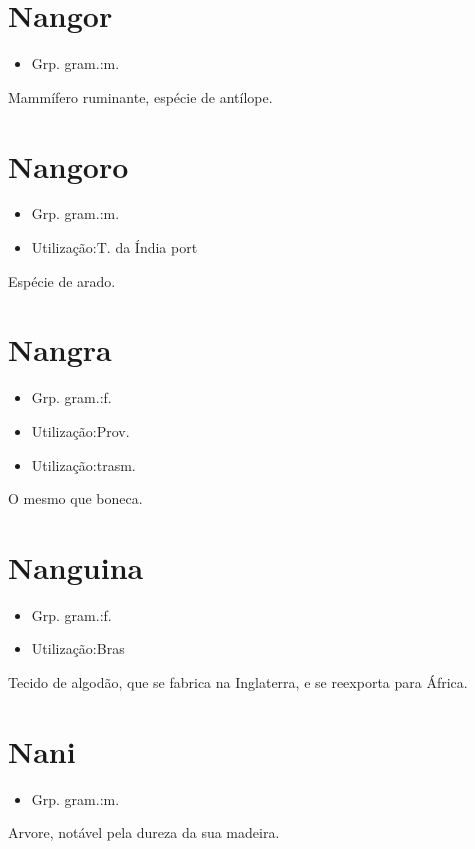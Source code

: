 \section{Nangor}
\begin{itemize}
\item {Grp. gram.:m.}
\end{itemize}
Mammífero ruminante, espécie de antílope.
\section{Nangoro}
\begin{itemize}
\item {Grp. gram.:m.}
\end{itemize}
\begin{itemize}
\item {Utilização:T. da Índia port}
\end{itemize}
Espécie de arado.
\section{Nangra}
\begin{itemize}
\item {Grp. gram.:f.}
\end{itemize}
\begin{itemize}
\item {Utilização:Prov.}
\end{itemize}
\begin{itemize}
\item {Utilização:trasm.}
\end{itemize}
O mesmo que \textunderscore boneca\textunderscore .
\section{Nanguina}
\begin{itemize}
\item {Grp. gram.:f.}
\end{itemize}
\begin{itemize}
\item {Utilização:Bras}
\end{itemize}
Tecido de algodão, que se fabrica na Inglaterra, e se reexporta para África.
\section{Nani}
\begin{itemize}
\item {Grp. gram.:m.}
\end{itemize}
Arvore, notável pela dureza da sua madeira.
